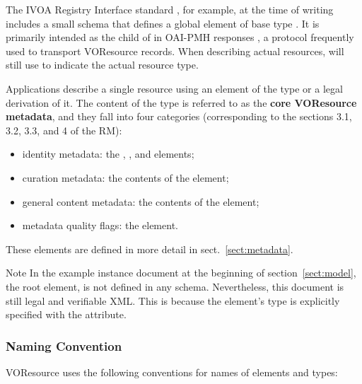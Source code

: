 \documentclass[11pt,a4paper]{ivoa}
\begin{document}
The IVOA Registry Interface standard \citep{2009ivoa.spec.1104B}, 
for example, at the time of writing includes a small schema that defines
a global element  of base type
.  It is primarily intended as the child of
 in OAI-PMH responses \citep{std:oaipmh}, a protocol
frequently used to transport VOResource records.  When describing actual
resources,  will still use  to
indicate the actual resource type.

Applications describe a single resource using an element of the type
 or a legal derivation of it.  The content of the
 type is referred to as the \textbf{core VOResource
metadata}, and they fall into four categories (corresponding to the
sections 3.1, 3.2, 3.3, and 4 of the RM):

\begin{itemize}
  \item identity metadata:  the ,
       , and
        elements;
  \item curation metadata:  the contents of the
        element;
  \item general content metadata:  the contents of the
        element;
  \item metadata quality flags:  the
        element.
\end{itemize}


These elements are defined in more detail in sect.~\ref{sect:metadata}.


\begin{admonition}{Note}
In the example instance
document at the beginning of section~\ref{sect:model}, the root element,
 is not defined in any schema.
Nevertheless, this document is still legal and verifiable XML.
This is because the element's type is explicitly specified with
the  attribute.
\end{admonition}


\subsubsection{Naming Convention}

VOResource uses the following conventions for
names of elements and types:
\end{document}
